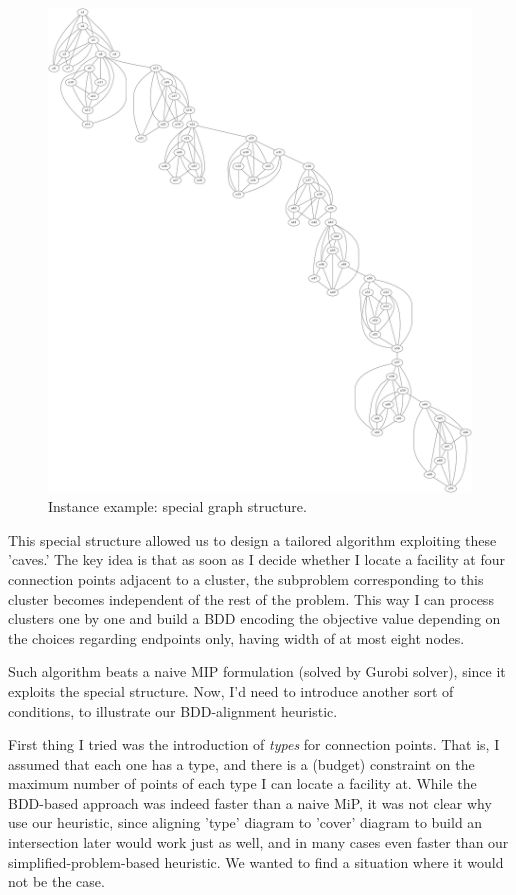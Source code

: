 \documentclass[11pt]{article}
\begin{document}
\begin{figure}[htbp]
\centering
\includegraphics[width=\textwidth]{./ex-inst.png}
\caption{\label{fig:ex-inst}Instance example: special graph structure.}
\end{figure}

This special structure allowed us to design a tailored algorithm exploiting
these 'caves.' The key idea is that as soon as I decide whether I locate a
facility at four connection points adjacent to a cluster, the subproblem
corresponding to this cluster becomes independent of the rest of the problem.
This way I can process clusters one by one and build a BDD encoding the
objective value depending on the choices regarding endpoints only, having width
of at most eight nodes.

Such algorithm beats a naive MIP formulation (solved by Gurobi solver), since it
exploits the special structure. Now, I'd need to introduce another sort of
conditions, to illustrate our BDD-alignment heuristic.

First thing I tried was the introduction of \emph{types} for connection points. That
is, I assumed that each one has a type, and there is a (budget) constraint on
the maximum number of points of each type I can locate a facility at. While the
BDD-based approach was indeed faster than a naive MiP, it was not clear why use
our heuristic, since aligning 'type' diagram to 'cover' diagram to build an
intersection later would work just as well, and in many cases even faster than
our simplified-problem-based heuristic. We wanted to find a situation where it
would not be the case.
\end{document}
